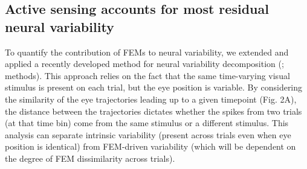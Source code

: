 \documentclass{lite}
\begin{document}
\subsection{Active sensing accounts for most residual neural variability}

To quantify the contribution of FEMs to neural variability, we extended and applied a recently developed method for neural variability decomposition (\cite{mcfarland2016variability}; methods). This approach relies on the fact that the same time-varying visual stimulus is present on each trial, but the eye position is variable. By considering the similarity of the eye trajectories leading up to a given timepoint (Fig. 2A), the distance between the trajectories dictates whether the spikes from two trials (at that time bin) come from the same stimulus or a different stimulus. This analysis can separate intrinsic variability (present across trials even when eye position is identical) from FEM-driven variability (which will be dependent on the degree of FEM dissimilarity across trials).

\end{document}
